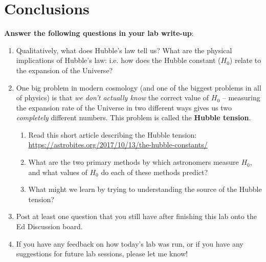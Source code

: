 \documentclass[11pt]{article}
\begin{document}
\section{Conclusions}
\textbf{Answer the following questions in your lab write-up}:
\begin{enumerate}[resume]

    \item Qualitatively, what does Hubble's law tell us? What are the physical implications of Hubble's law: i.e. how does the Hubble constant ($H_0$) relate to the expansion of the Universe?
    
    \item One big problem in modern cosmology (and one of the biggest problems in all of physics) is that \emph{we don't actually know} the correct value of $H_0$ -- measuring the expansion rate of the Universe in two different ways gives us two \emph{completely} different numbers. This problem is called the \textbf{Hubble tension}.
    \begin{enumerate}
        \item Read this short article describing the Hubble tension: \url{https://astrobites.org/2017/10/13/the-hubble-constants/}
        
        \item What are the two primary methods by which astronomers measure $H_0$, and what values of $H_0$ do each of these methods predict?
        
        \item What might we learn by trying to understanding the source of the Hubble tension?
    \end{enumerate}

    \item Post at least one question that you still have after finishing this lab onto the Ed Discussion board.
    
    \item If you have any feedback on how today's lab was run, or if you have any suggestions for future lab sessions, please let me know!
    
    
\end{enumerate}
\end{document}
